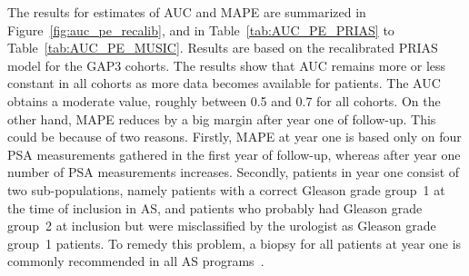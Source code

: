 The results for estimates of AUC and MAPE are summarized in Figure~\ref{fig:auc_pe_recalib}, and in Table~\ref{tab:AUC_PE_PRIAS} to Table~\ref{tab:AUC_PE_MUSIC}. Results are based on the recalibrated PRIAS model for the GAP3 cohorts. The results show that AUC remains more or less constant in all cohorts as more data becomes available for patients. The AUC obtains a moderate value, roughly between 0.5 and 0.7 for all cohorts. On the other hand, MAPE reduces by a big margin after year one of follow-up. This could be because of two reasons. Firstly, MAPE at year one is based only on four PSA measurements gathered in the first year of follow-up, whereas after year one number of PSA measurements increases. Secondly, patients in year one consist of two sub-populations, namely patients with a correct Gleason grade group~1 at the time of inclusion in AS, and patients who probably had Gleason grade group~2 at inclusion but were misclassified by the urologist as Gleason grade group~1 patients. To remedy this problem, a biopsy for all patients at year one is commonly recommended in all AS programs~\citep{bokhorst2015compliance}.

